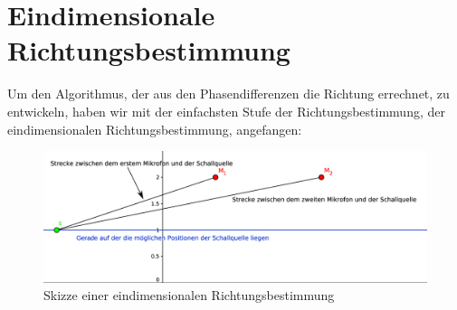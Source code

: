\section{Eindimensionale Richtungsbestimmung}
Um den Algorithmus, der aus den Phasendifferenzen die Richtung errechnet, zu entwickeln, haben wir mit der
einfachsten Stufe der Richtungsbestimmung, der eindimensionalen Richtungsbestimmung, angefangen:
\begin{figure}[H]
    \centering
    \includegraphics[width=\linewidth]{img/skizze}
    \caption{Skizze einer eindimensionalen Richtungsbestimmung\label{fig:skizz1d}}
\end{figure}


